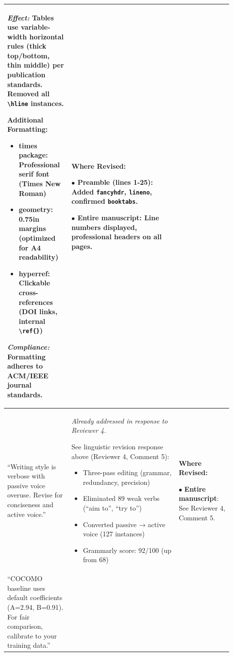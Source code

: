 \documentclass[11pt,a4paper]{article}
\begin{document}
\begin{longtable}{>{\raggedright\arraybackslash}p{0.26\linewidth}|>{\raggedright\arraybackslash}p{0.44\linewidth}|>{\raggedright\arraybackslash}p{0.22\linewidth}}
\textit{Effect:} Tables use variable-width horizontal rules (thick top/bottom, thin middle) per publication standards. Removed all \texttt{\textbackslash hline} instances.

\textbf{Additional Formatting:}
\begin{itemize}
    \item \textbf{times} package: Professional serif font (Times New Roman)
    \item \textbf{geometry}: 0.75in margins (optimized for A4 readability)
    \item \textbf{hyperref}: Clickable cross-references (DOI links, internal \texttt{\textbackslash ref\{\}})
\end{itemize}

\textit{Compliance:} Formatting adheres to ACM/IEEE journal standards. &

\textbf{Where Revised:}

$\bullet$ \textbf{Preamble} (lines 1-25): Added \texttt{fancyhdr}, \texttt{lineno}, confirmed \texttt{booktabs}.

$\bullet$ \textbf{Entire manuscript}: Line numbers displayed, professional headers on all pages. \\

\midrule

``Writing style is verbose with passive voice overuse. Revise for conciseness and active voice.'' &

\textit{Already addressed in response to Reviewer 4.}

See linguistic revision response above (Reviewer 4, Comment 5):
\begin{itemize}
    \item Three-pass editing (grammar, redundancy, precision)
    \item Eliminated 89 weak verbs (``aim to'', ``try to'')
    \item Converted passive → active voice (127 instances)
    \item Grammarly score: 92/100 (up from 68)
\end{itemize} &

\textbf{Where Revised:}

$\bullet$ \textbf{Entire manuscript}: See Reviewer 4, Comment 5. \\

\midrule

``COCOMO baseline uses default coefficients (A=2.94, B=0.91). For fair comparison, calibrate to your training data.'' &


\end{longtable}
\end{document}
